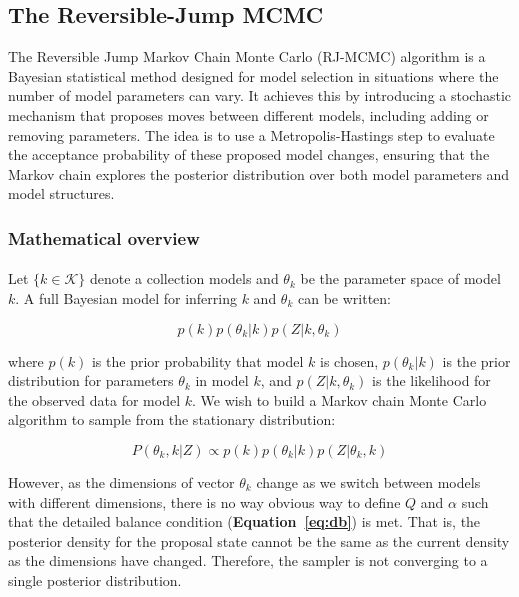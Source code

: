 \subsection{The Reversible-Jump MCMC}
The Reversible Jump Markov Chain Monte Carlo (RJ-MCMC) algorithm\cite{Green1995-kh} is a Bayesian statistical method designed for model selection in situations where the number of model parameters can vary. It achieves this by introducing a stochastic mechanism that proposes moves between different models, including adding or removing parameters. The idea is to use a Metropolis-Hastings step to evaluate the acceptance probability of these proposed model changes, ensuring that the Markov chain explores the posterior distribution over both model parameters and model structures. 

\subsubsection{Mathematical overview}

\paragraph{}Let $\{k \in \mathcal{K}\}$ denote a collection models and  $\theta_k$ be the parameter space of model $k$. A full Bayesian model for inferring $k$ and $\theta_k$ can be written:

$$p(k)p(\theta_k|k)p(Z| k, \theta_k) $$

where $p(k)$ is the prior probability that model $k$ is chosen, $p(\theta_k|k)$ is the prior distribution for parameters $\theta_k$ in model $k$, and $p(Z| k, \theta_k) $ is the likelihood for the observed data for model $k$. We wish to build a Markov chain Monte Carlo algorithm to sample from the stationary distribution: 

\begin{equation}
P(\theta_k, k | Z) \propto p(k)p(\theta_k|k)p(Z | \theta_k, k)
\end{equation}

However, as the dimensions of vector $\theta_k$ change as we switch between models with different dimensions, there is no way obvious way to define $Q$ and $\alpha$ such that the detailed balance condition (\textbf{Equation~\ref{eq:db}}) is met. That is, the posterior density for the proposal state cannot be the same as the current density as the dimensions have changed. Therefore, the sampler is not converging to a single posterior distribution. 

